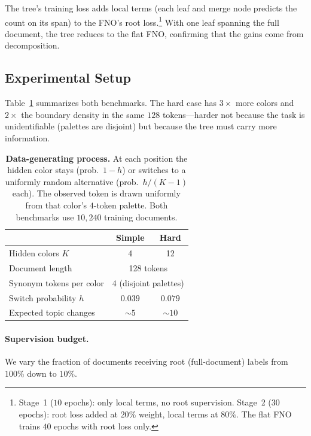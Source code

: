 The tree's training loss adds local terms (each leaf and merge node predicts the count on its span) to the FNO's root loss.\footnote{Stage~1 ($10$ epochs): only local terms, no root supervision. Stage~2 ($30$ epochs): root loss added at $20\%$ weight, local terms at $80\%$. The flat FNO trains $40$ epochs with root loss only.} With one leaf spanning the full document, the tree reduces to the flat FNO, confirming that the gains come from decomposition.

\subsection{Experimental Setup}\label{sec:experiment-setup}

Table~\ref{tab:dgp} summarizes both benchmarks. The hard case has $3{\times}$ more colors and $2{\times}$ the boundary density in the same $128$ tokens---harder not because the task is unidentifiable (palettes are disjoint) but because the tree must carry more information.

\begin{table}[t]
    \centering
    \small
    \begin{tabular}{lcc}
        \toprule
        & \textbf{Simple} & \textbf{Hard} \\
        \midrule
        Hidden colors $K$ & 4 & 12 \\
        Document length & \multicolumn{2}{c}{128 tokens} \\
        Synonym tokens per color & \multicolumn{2}{c}{4 (disjoint palettes)} \\
        \midrule
        Switch probability $h$ & $0.039$ & $0.079$ \\
        Expected topic changes & ${\sim}5$ & ${\sim}10$ \\
        \bottomrule
    \end{tabular}
    \caption{\textbf{Data-generating process.}
    At each position the hidden color stays (prob.\ $1{-}h$) or switches to a uniformly random alternative (prob.\ $h/(K{-}1)$ each). The observed token is drawn uniformly from that color's $4$-token palette. Both benchmarks use $10{,}240$ training documents.}
    \label{tab:dgp}
\end{table}

\paragraph{Supervision budget.}
We vary the fraction of documents receiving root (full-document) labels from $100\%$ down to $10\%$.

